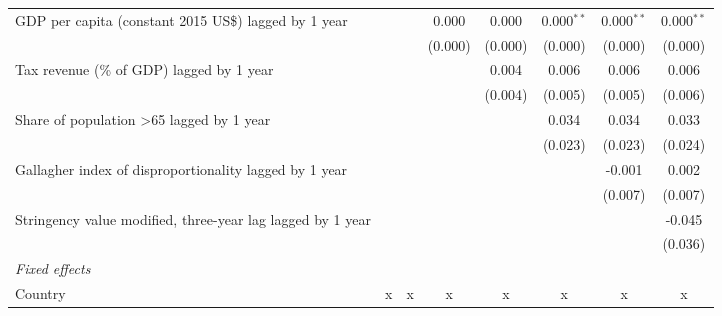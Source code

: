 \begin{tabular}{lccccccc}
   GDP per capita (constant 2015 US\$) lagged by 1 year                                         &              &              & 0.000        & 0.000        & 0.000$^{**}$ & 0.000$^{**}$ & 0.000$^{**}$\\   
                                                                                                &              &              & (0.000)      & (0.000)      & (0.000)      & (0.000)      & (0.000)\\   
   Tax revenue (\% of GDP) lagged by 1 year                                                     &              &              &              & 0.004        & 0.006        & 0.006        & 0.006\\   
                                                                                                &              &              &              & (0.004)      & (0.005)      & (0.005)      & (0.006)\\   
   Share of population >65 lagged by 1 year                                                     &              &              &              &              & 0.034        & 0.034        & 0.033\\   
                                                                                                &              &              &              &              & (0.023)      & (0.023)      & (0.024)\\   
   Gallagher index of disproportionality lagged by 1 year                                       &              &              &              &              &              & -0.001       & 0.002\\   
                                                                                                &              &              &              &              &              & (0.007)      & (0.007)\\   
   Stringency value modified, three-year lag lagged by 1 year                                   &              &              &              &              &              &              & -0.045\\   
                                                                                                &              &              &              &              &              &              & (0.036)\\   
   \emph{Fixed effects}\\
   Country                                                                                      & x            & x            & x            & x            & x            & x            & x\\  

\end{tabular}
